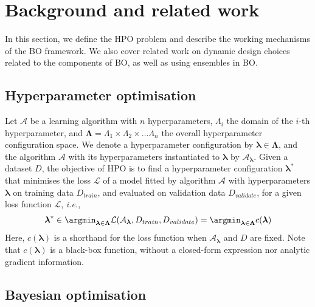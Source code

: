 \section{Background and related work}
\label{sec:ch05:back-rw}

In this section, we define the HPO problem and describe the working mechanisms of the BO framework. 
We also cover related work on dynamic design choices related to the components of BO, as well as using ensembles in BO.

\subsection{Hyperparameter optimisation} Let $\mathcal{A}$ be a learning algorithm with $n$ hyperparameters, $\Lambda_{i}$ the domain of the $i$-th hyperparameter, and $\boldsymbol{\Lambda} = \Lambda_{1} \times \Lambda_{2} \times \dots \Lambda_{n}$ the overall hyperparameter configuration space. 
We denote a hyperparameter configuration by $\boldsymbol{\lambda} \in \boldsymbol{\Lambda}$, and the algorithm $\mathcal{A}$ with its hyperparameters instantiated to $\boldsymbol{\lambda}$ by $\mathcal{A}_{\boldsymbol{\lambda}}$.
Given a dataset $D$, the objective of HPO is to find a hyperparameter configuration $\boldsymbol{\lambda}^{*}$ that minimises the loss $\mathcal{L}$ of a model fitted by algorithm $\mathcal{A}$ with hyperparameters $\boldsymbol{\lambda}$ on training data ${D}_{train}$, and evaluated on validation data ${D}_{validate}$, for a given loss function $\mathcal{L}$, \emph{i.e.},
\begin{equation}
\label{eq:ch05:def-hpo}
\boldsymbol{\lambda}^{*} \in \argmin_{\boldsymbol{\lambda} \in \boldsymbol{\Lambda}} 
\mathcal{L}(\mathcal{A}_{\boldsymbol{\lambda}}, {D}_{train}, {D}_{validate}) = \argmin_{\boldsymbol{\lambda} \in \boldsymbol{\Lambda}} c(\boldsymbol{\lambda})
\end{equation}
Here, $c(\boldsymbol{\lambda})$ is a shorthand for the loss function when $\mathcal{A}_{\boldsymbol{\lambda}}$ and $D$ are fixed.
Note that $c(\boldsymbol{\lambda})$ is a black-box function, without a closed-form expression nor analytic gradient information.

\subsection{Bayesian optimisation} 
\label{sec:ch05:bac_bo}

